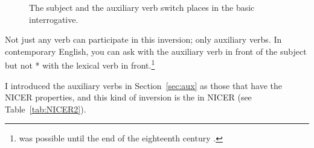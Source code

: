 \begin{figure}
    \caption{The subject and the auxiliary verb  switch places in the basic interrogative.}
    \label{fig:subj-aux-inversion}
\end{figure}

Not just any verb can participate in this inversion; only auxiliary verbs. In contemporary English, you can ask  with the auxiliary verb  in front of the subject  but not * with the lexical verb  in front.\footnote{ was possible until the end of the eighteenth century \citep[239]{Lass1999}.}

I introduced the auxiliary verbs in Section~\ref{sec:aux} as those that have the NICER properties, and this kind of inversion is the  in NICER (see Table~\ref{tab:NICER2}).

